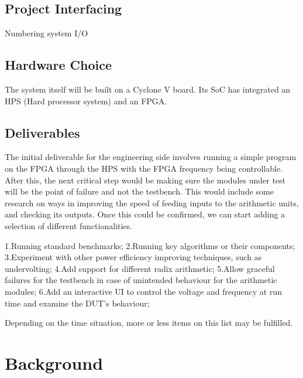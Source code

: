 \documentclass[journal]{IEEEtran}
\begin{document}
\subsection{Project Interfacing}
Numbering system
I/O

\subsection{Hardware Choice}
The system itself will be built on a Cyclone V board. Its SoC has integrated an HPS (Hard processor system) and an FPGA.

\subsection{Deliverables}
The initial deliverable for the engineering side involves running a simple program on the FPGA through the HPS with the FPGA frequency being controllable. After this, the next critical step would be making sure the modules under test will be the point of failure and not the testbench. This would include some research on ways in improving the speed of feeding inputs to the arithmetic units, and checking its outputs. Once this could be confirmed, we can start adding a selection of different functionalities.

1.Running standard benchmarks;
2.Running key algorithms or their components;
3.Experiment with other power efficiency improving techniques, such as undervolting;
4.Add support for different radix arithmetic;
5.Allow graceful failures for the testbench in case of unintended behaviour for the arithmetic modules;
6.Add an interactive UI to control the voltage and frequency at run time and examine the DUT’s behaviour;

Depending on the time situation, more or less items on this list may be fulfilled.

\section{Background}
\end{document}
